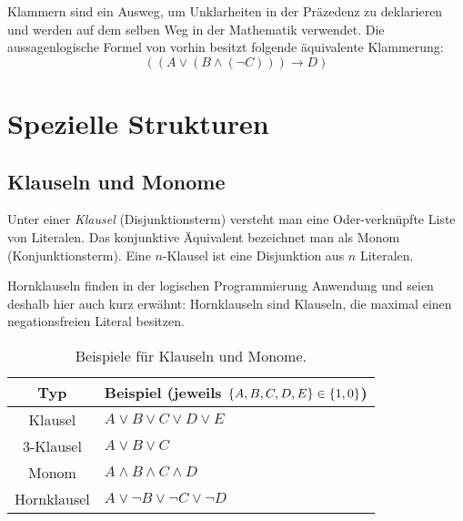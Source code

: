 Klammern sind ein Ausweg, um Unklarheiten in der Präzedenz zu deklarieren und werden auf dem selben Weg in der Mathematik verwendet.
Die aussagenlogische Formel von vorhin besitzt folgende äquivalente Klammerung:
%
\begin{equation}
  ((A \lor (B \land (\neg C))) \rightarrow D)
\end{equation}
%
\section{Spezielle Strukturen}
%
\subsection{Klauseln und Monome}
%
Unter einer \emph{Klausel} (Disjunktionsterm) versteht man eine Oder-verknüpfte Liste von Literalen. Das konjunktive Äquivalent bezeichnet man als Monom (Konjunktionsterm). Eine $n$-Klausel ist eine Disjunktion aus $n$ Literalen.

Hornklauseln finden in der logischen Programmierung Anwendung und seien deshalb hier auch kurz erwähnt: Hornklauseln sind Klauseln, die maximal einen negationsfreien Literal besitzen.
%
\begin{table}[ht]
 \begin{center}
  \begin{tabular}{cl}
   \hline
    Typ         & Beispiel (jeweils $\left\{A, B, C, D, E\right\} \in \left\{1, 0\right\}$) \\
   \hline \hline
    Klausel     & $A \lor B \lor C \lor D \lor E$ \\
    3-Klausel   & $A \lor B \lor C$ \\
    Monom       & $A \land B \land C \land D$ \\
    Hornklausel & $A \lor \neg B \lor \neg C \lor \neg D$ \\
   \hline
  \end{tabular}
  \caption{Beispiele für Klauseln und Monome.}
  \label{fig:clauses_monoms}
 \end{center}
\end{table}
%
